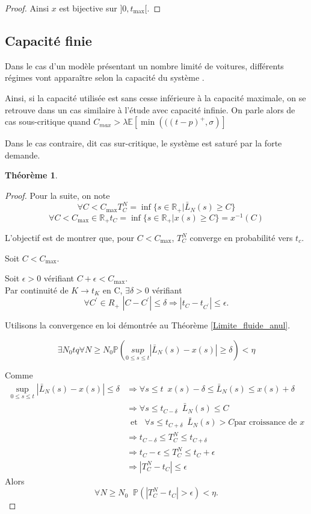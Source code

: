 \documentclass[12pt,a4paper]{article}
\newcommand{\E}[1]{\mathbb{E}\left[ #1 \right]}
\newcommand{\R}{\mathbb{R}}
\newcommand{\1}[1]{\mathbbm{1}_{\{#1\}} }
\newtheorem{theorem}{Théorème}
\theoremstyle{definition}
\begin{document}
{\begin{proof}
Ainsi $x$ est bijective sur $]0,t_{\max}[$.
\end{proof}


\subsection{Capacité finie}

Dans le cas d'un modèle présentant un nombre limité de voitures, différents régimes vont apparaître selon la capacité du système .

Ainsi, si la capacité utilisée est sans cesse inférieure à la capacité maximale, on se retrouve dans un cas similaire à l'étude avec capacité infinie. On parle alors de cas sous-critique quand $C_{max} > \lambda \E{\min\left(((t-p)^+,\sigma\right)}$

Dans le cas contraire, dit cas sur-critique, le système est saturé par la forte demande.




\begin{theorem}

\end{theorem}

\begin{proof}


Pour la suite, on note
$$\forall C <C_{\max} T_C^N = \inf\{s\in \R_+ | \bar{L}_N(s) \geq C\}$$
$$\forall C <C_{\max} \in \R_+ t_C = \inf\{s\in \R_+ | x(s) \geq C\} = x^{-1}(C)$$


L'objectif est de montrer que, pour $C<C_{\max}$, $T_C^N$ converge en probabilité vers $t_c$.

Soit $C<C_{\max}$.

Soit $\epsilon > 0$ vérifiant $C+\epsilon < C_{\max}$.\\

Par continuité de $K \to t_K$ en C, $\exists \delta > 0$ vérifiant $$\forall C^{'} \in R_+\,\,|C-C^{'}|\leq\delta \Rightarrow |t_C-t_{C^{'}}| \leq \epsilon.$$



Utilisons la convergence en loi démontrée au Théorème \ref{Limite_fluide_anul}.

$$\exists N_0 tq \forall N \geq N_0 \mathbb{P}\left(\underset{0\leq s \leq t}{sup} |\bar{L}_N(s) - x(s)| \geq \delta \right) < \eta$$

Comme
\begin{align*}
\underset{0\leq s \leq t}{\sup} |\bar{L}_N(s) - x(s)| \leq \delta &\Rightarrow \forall s \leq t \,\,\, x(s) - \delta\leq\bar{L}_N(s) \leq x(s) + \delta\\
&\Rightarrow  \forall s \leq t_{C-\delta}\,\,\, \bar{L}_N(s) \leq C\\
&\,\,\,\text{et}\,\,\,\,\,  \forall s \leq t_{C+\delta}\,\,\, \bar{L}_N(s) > C    \text{par croissance de $x$}\\
&\Rightarrow  t_{C-\delta} \leq T_C^N \leq t_{C+\delta}\\
&\Rightarrow  t_{C}-\epsilon \leq T_C^N \leq t_{C}+\epsilon\\
&\Rightarrow  |T_C^N-t_C| \leq \epsilon
\end{align*} 
Alors $$\forall N \geq N_0\;\; \mathbb{P}\left(|T_C^N-t_C| > \epsilon\right) <\eta.$$


\end{proof}}
\end{document}
